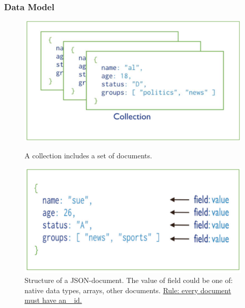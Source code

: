 \documentclass[10pt,a4paper]{article}
\begin{document}
\subsubsection{Data Model} 

\begin{figure}[ht!]
\centering
\begin{minipage}{.5\textwidth}
  \centering
  \includegraphics[width=.8\linewidth]{images/mongodb-data-model}
    \caption{A collection includes a set of documents.}
\end{minipage}%
\begin{minipage}{.5\textwidth}
  \centering
  \includegraphics[width=.8\linewidth]{images/mongodb-data-model2}
  \caption{Structure of a JSON-document. The value of field could be one of: native data types, arrays, other documents. \uline{Rule: every document must have an \_id.}}
\end{minipage}
\end{figure} 
\end{document}
